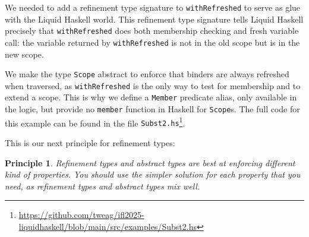 \documentclass[sigconf]{acmart}
\newcommand{\tc}[1]{{\small\texttt{#1}}}
\newcommand{\sourcefile}[1]{\tc{#1}\footnote{\scriptsize\url{https://github.com/tweag/ifl2025-liquidhaskell/blob/main/src/examples/#1}}}
\newtheorem{principle}{Principle}
\begin{document}
We needed to add a refinement type signature to \tc{withRefreshed} to serve as
glue with the Liquid Haskell world. This refinement type signature tells Liquid
Haskell precisely that \tc{withRefreshed} does both membership checking and
fresh variable call: the variable returned by \tc{withRefreshed} is not in the
old scope but is in the new scope.

We make the type \tc{Scope} abstract to enforce that binders are always
refreshed when traversed, as \tc{withRefreshed} is the only
way to test for membership and to extend a scope. This is why we define a
\tc{Member} predicate alias, only available in the logic, but provide no
\tc{member} function in Haskell for \tc{Scope}s.
The full code for this example can be found in the
file \sourcefile{Subst2.hs}.

This is our next principle for refinement types:
\begin{principle}
  Refinement types and abstract types are best at enforcing different kind of
  properties. You should use the simpler solution for each property that you
  need, as refinement types and abstract types mix well.
\end{principle}




\end{document}
